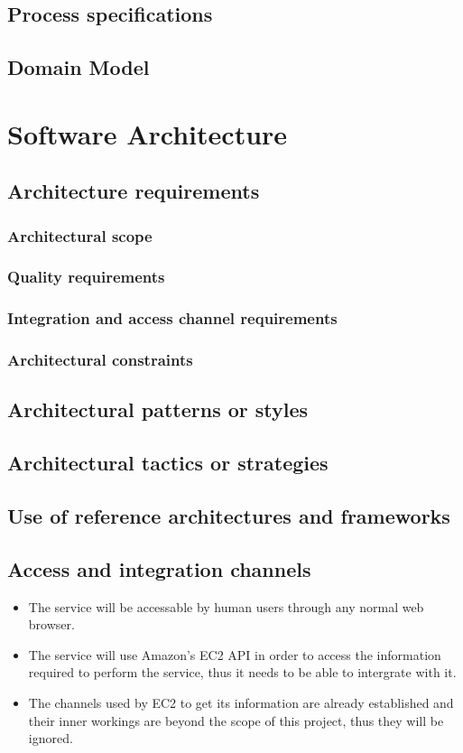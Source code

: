 \documentclass[a4paper,12pt]{report}
\begin{document}
	\subsection{Process specifications}
	\subsection{Domain Model}
\section{Software Architecture}
	\subsection{Architecture requirements}
		\subsubsection{Architectural scope}
		\subsubsection{Quality requirements}
		\subsubsection{Integration and access channel requirements}
		\subsubsection{Architectural constraints}
	\subsection{Architectural patterns or styles}
	\subsection{Architectural tactics or strategies}
	\subsection{Use of reference architectures and frameworks}
	\subsection{Access and integration channels}
		\begin{itemize}
			\item The service will be accessable by human users through any normal web browser.
			\item The service will use Amazon's EC2 API in order to access the information required to perform the service, thus it needs to be able to intergrate with it.
			\item The channels used by EC2 to get its information are already established and their inner workings are beyond the scope of this project, thus they will be ignored.
		\end{itemize}
\end{document}
